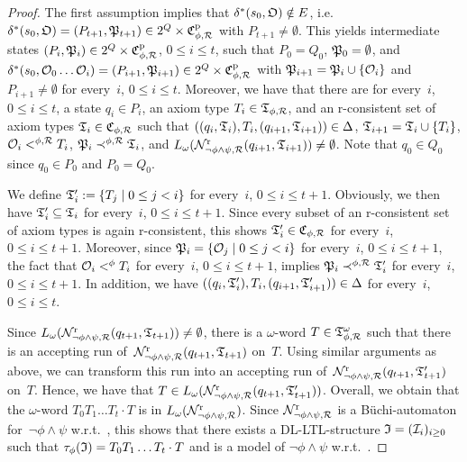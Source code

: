 \begin{proof}
    The first assumption implies that
    $\delta^*(s_0,\mathfrak{O})\notin E$,
    i.e.~$\delta^*(s_0,\mathfrak{O})=(P_{t+1},\mathfrak{P}_{t+1})\in 2^Q\times\mathfrak{C}_{\phi,\mathcal{R}}^\text{p}$
    with $P_{t+1}\ne\emptyset$.
    This yields intermediate states
    $(P_i,\mathfrak{P}_i)\in 2^Q\times\mathfrak{C}_{\phi,\mathcal{R}}^\text{p}$, $0\le i\le t$, such
    that $P_0=Q_0$, $\mathfrak{P}_0=\emptyset$, and
    $\delta^*(s_0,\mathcal{O}_0\dots\mathcal{O}_i)=(P_{i+1},\mathfrak{P}_{i+1})\in 2^Q\times\mathfrak{C}_{\phi,\mathcal{R}}^\text{p}$
    with $\mathfrak{P}_{i+1}=\mathfrak{P}_i\cup\{\mathcal{O}_i\}$ and $P_{i+1}\ne\emptyset$ for
    every~$i$, $0\le i\le t$.
    Moreover, we have that there are for every~$i$, $0\le i\le t$, a state
    $q_i\in P_i$, an axiom type $T_i\in\mathfrak{T}_{\phi,\mathcal{R}}$, and an r-consistent set
    of axiom types $\mathfrak{T}_i\in\mathfrak{C}_{\phi,\mathcal{R}}$ such that
    $((q_i,\mathfrak{T}_i),T_i,(q_{i+1},\mathfrak{T}_{i+1}))\in\Delta$,
    $\mathfrak{T}_{i+1}=\mathfrak{T}_i\cup\{T_i\}$, $\mathcal{O}_i<^{\phi,\mathcal{R}}T_i$,
    $\mathfrak{P}_i\prec^{\phi,\mathcal{R}}\mathfrak{T}_i$, and
    $L_\omega(\mathcal{N}_{\lnot\phi\land\psi,\mathcal{R}}^\text{r}(q_{i+1},\mathfrak{T}_{i+1}))\ne\emptyset$.
    Note that $q_0\in Q_0$ since $q_0\in P_0$ and $P_0=Q_0$.

    We define $\mathfrak{T}_i':=\{T_j\mid 0\le j<i\}$ for every~$i$, $0\le i\le t+1$.
    Obviously, we then have $\mathfrak{T}_i'\subseteq\mathfrak{T}_i$ for every~$i$,
    $0\le i\le t+1$.  Since every subset of an r-consistent set of axiom types
    is again r-consistent, this shows $\mathfrak{T}_i'\in\mathfrak{C}_{\phi,\mathcal{R}}$ for
    every~$i$, $0\le i\le t+1$.  Moreover, since
    $\mathfrak{P}_i=\{\mathcal{O}_j\mid 0\le j<i\}$ for every~$i$, $0\le i\le t+1$, the fact
    that $\mathcal{O}_i<^\phi T_i$ for every~$i$, $0\le i\le t+1$, implies
    $\mathfrak{P}_i\prec^{\phi,\mathcal{R}}\mathfrak{T}_i'$ for every~$i$, $0\le i\le t+1$.  In
    addition, we have
    $((q_i,\mathfrak{T}_i'),T_i,(q_{i+1},\mathfrak{T}_{i+1}'))\in\Delta$ for every~$i$,
    $0\le i\le t$.

    Since
    $L_\omega(\mathcal{N}_{\lnot\phi\land\psi,\mathcal{R}}^\text{r}(q_{t+1},\mathfrak{T}_{t+1}))\ne\emptyset$,
    there is a $\omega$-word $T\in\mathfrak{T}_{\phi,\mathcal{R}}^\omega$ such that there is an
    accepting run
    of~$\mathcal{N}_{\lnot\phi\land\psi,\mathcal{R}}^\text{r}(q_{t+1},\mathfrak{T}_{t+1})$ on~$T$.
    Using similar arguments as above, we can transform this run into an
    accepting run
    of~$\mathcal{N}_{\lnot\phi\land\psi,\mathcal{R}}^\text{r}(q_{t+1},\mathfrak{T}_{t+1}')$ on~$T$.
    Hence, we have that
    $T\in L_\omega(\mathcal{N}_{\lnot\phi\land\psi,\mathcal{R}}^\text{r}(q_{t+1},\mathfrak{T}_{t+1}'))$.
    Overall, we obtain that the $\omega$-word $T_0T_1\dots T_t\cdot T$ is in
    $L_\omega(\mathcal{N}_{\lnot\phi\land\psi,\mathcal{R}}^\text{r})$.  Since
    $\mathcal{N}_{\lnot\phi\land\psi,\mathcal{R}}^\text{r}$ is a Büchi-automaton
    for~$\lnot\phi\land\psi$ w.r.t.~\Rmc, this shows that there exists a
    DL-LTL-structure $\mathfrak{I}=(\mathcal{I}_i)_{i\ge 0}$ such that
    $\tau_\phi(\mathfrak{I})=T_0T_1\dots T_t\cdot T$ and \Imf is a model of
    $\lnot\phi\land\psi$ w.r.t.~\Rmc.


\end{proof}
